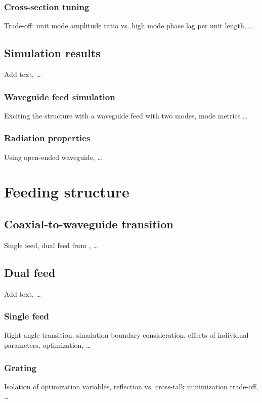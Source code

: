 \documentclass[11pt,a4paper,twoside,openany]{report}
\begin{document}
\subsection{Cross-section tuning}
Trade-off: unit mode amplitude ratio vs. high mode phase lag per unit length, \dots

\section{Simulation results}
Add text, \dots

\subsection{Waveguide feed simulation}
Exciting the structure with a waveguide feed with two modes, mode metrics \dots

\subsection{Radiation properties}
Using open-ended waveguide, \dots

\chapter{Feeding structure}
\label{chapter:feeding-structure}

\section{Coaxial-to-waveguide transition}
Single feed, dual feed from \parencite{karki-et-al:dual-polarized-probe-for-planar-near-field-measurement}, \dots

\section{Dual feed}
Add text, \dots

\subsection{Single feed}
Right-angle transition, simulation boundary consideration, effects of individual parameters, optimization, \dots

\subsection{Grating}
Isolation of optimization variables, reflection vs. cross-talk minimization trade-off, \dots
\end{document}
